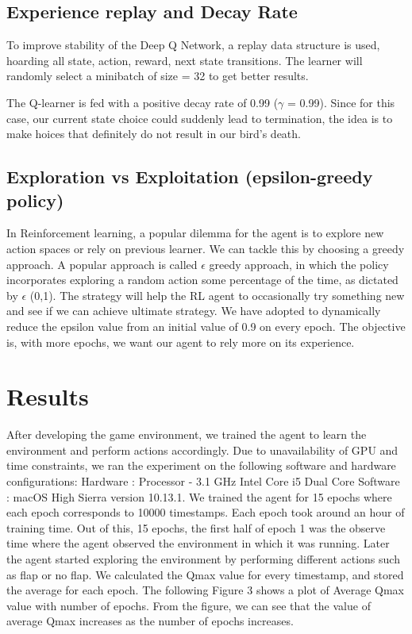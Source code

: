 \documentclass{article}
\begin{document}
\subsection{Experience replay and Decay Rate}
To improve stability of the Deep Q Network, a replay data structure is used, hoarding all state, action, reward, next state transitions. The learner will randomly select a minibatch of size = 32 to get better results. 

The Q-learner is fed with a positive decay rate of 0.99 ($\gamma$ = 0.99). Since for this case, our current state choice could suddenly lead to termination, the idea is to make hoices that definitely do not result in our bird's death.

\subsection{Exploration vs Exploitation (epsilon-greedy policy)}
In Reinforcement learning, a popular dilemma for the agent is to explore new action spaces or rely on previous learner. We can tackle this by choosing a greedy approach. A popular approach is called $\epsilon$ greedy approach, in which the policy incorporates exploring a  random action some percentage of the time, as dictated by $\epsilon$ (0,1). The strategy will help the RL agent to occasionally try something new and see if we can achieve ultimate strategy. We have adopted to dynamically reduce the epsilon value from an initial value of 0.9 on every epoch. The objective is, with more epochs, we want our agent to rely more on its experience. 


\section{Results}
After developing the game environment, we trained the agent to learn the environment and perform actions accordingly. Due to unavailability of GPU and time constraints, we ran the experiment on the following software and hardware configurations:
Hardware : Processor - 3.1 GHz Intel Core i5 Dual Core
Software : macOS High Sierra version 10.13.1.
We trained the agent for 15 epochs where each epoch corresponds to 10000 timestamps. Each epoch took around an hour of training time. Out of this, 15 epochs, the first half of epoch 1 was the observe time where the agent observed the environment in which it was running. Later the agent started exploring the environment by performing different actions such as flap or no flap. We calculated the Qmax value for every timestamp, and stored the average for each epoch. The following Figure 3 shows a plot of Average Qmax value with number of epochs. From the figure, we can see that the value of average Qmax increases as the number of epochs increases.
\end{document}
